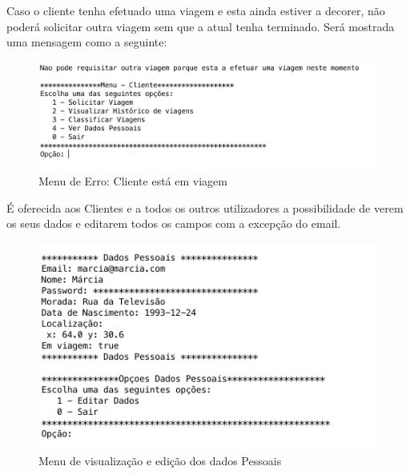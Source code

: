Caso o cliente tenha efetuado uma viagem e esta ainda estiver a decorer, não poderá solicitar outra viagem sem que a atual tenha terminado. Será mostrada uma mensagem como a seguinte: 
\begin{figure}[htpb]
	\centering
	\includegraphics[scale=0.6]{imagem/erroEmViagem}
	\caption{Menu de Erro: Cliente está em viagem }
	\label{p3:fig:p3_erroEmViagem}
\end{figure}

É oferecida aos Clientes e a todos os outros utilizadores a possibilidade de verem os seus dados e editarem todos os campos com a excepção do email. 
\begin{figure}[htpb]
	\centering
	\includegraphics[scale=0.6]{imagem/verDadosPessoais}
	\caption{Menu de visualização e edição dos dados Pessoais }
	\label{p3:fig:p3_verDadosPessoais}
\end{figure}

\newpage
